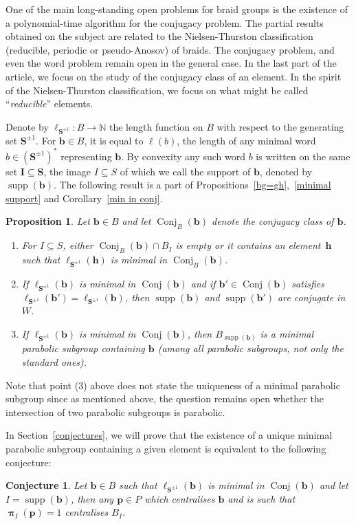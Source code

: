 \documentclass{amsart}
\numberwithin{equation}{section}
\newtheorem{proposition}[equation]{Proposition}
\newtheorem{conjecture}[equation]{Conjecture}
\newcommand\hl{{\ell}}
\newcommand\lS{{\ell_{\bS^{\pm1}}}}
\newcommand\bb{{\mathbf b}}
\newcommand\bh{{\mathbf h}}
\newcommand\bp{{\mathbf p}}
\newcommand\bI{{\mathbf I}}
\newcommand\bS{{\mathbf S}}
\newcommand\BN{{\mathbb N}}
\DeclareMathOperator\bpi{\boldsymbol\pi}
\DeclareMathOperator\supp{supp}
\DeclareMathOperator\conj{Conj}
\begin{document}
One  of the main long-standing open problems for braid groups is the existence
of a polynomial-time algorithm for
the conjugacy problem. The partial results obtained on the subject are
related to the Nielsen-Thurston classification (reducible, periodic or 
pseudo-Anosov)  of braids.  The conjugacy  problem, and  even the word problem remain
open in the general case. In the last part of the article, we focus on the
study of the conjugacy class of an element. In the spirit of the
Nielsen-Thurston  classification, we focus  on what might  be called
``\emph{reducible}''
elements.

Denote by \index{lS@$\lS$} $\lS:B\to\BN$ the length function  on  $B$ with respect to the generating
set $\bS^{\pm 1}$. For $\bb\in B$, it is equal to
$\hl(b)$,  the length of any minimal word $b\in(\bS^{\pm1})^*$ representing $\bb$.
By  convexity
any such  word $b$ is written on
the same set $\bI\subseteq\bS$, the image $I\subseteq S$ of which we call the
support of $\bb$, denoted by  $\supp(\bb)$.
The following result is a part of Propositions~\ref{bg=gh},~\ref{minimal  support} and
Corollary~\ref{min in conj}.
\begin{proposition}\label{propIntro5}
Let  $\bb\in  B$ and let $\conj_B(\bb)$ denote the conjugacy class of $\bb$. 
\begin{enumerate}
\item  For $I\subseteq S$, either $\conj_B(\bb)\cap B_I$ is empty or it contains an
element~$\bh$  such that $\lS(\bh)$ is minimal in $\conj_B(\bb)$. 
\item  If  $\lS(\bb)$  is minimal in $\conj(\bb)$ and if $\bb'\in \conj(\bb)$
satisfies $\lS(\bb') = \lS(\bb)$, then $\supp(\bb)$ and $\supp(\bb')$
are conjugate in $W$.
\item If  $\lS(\bb)$  is minimal in $\conj(\bb)$,  then $B_{\supp(\bb)}$ is a minimal
parabolic subgroup containing $\bb$ (among all parabolic subgroups,
not only the standard ones).
\end{enumerate}
\end{proposition}

Note that point (3) above does not state the uniqueness of a minimal parabolic subgroup
since as mentioned above, the question remains open whether the intersection
of two parabolic subgroups is parabolic.

In  Section~\ref{conjectures}, we  will prove  that the  existence of a unique
minimal  parabolic subgroup  containing a  given element  is equivalent to the
following conjecture:
\begin{conjecture}\label{conjectureintr}
Let $\bb\in B$ such that $\lS(\bb)$  is minimal in $\conj(\bb)$
and let $I=\supp(\bb)$, then
any $\bp\in P$ which centralises $\bb$ and is such that $\bpi_I(\bp)=1$
centralises $B_I$.
\end{conjecture}
\end{document}

